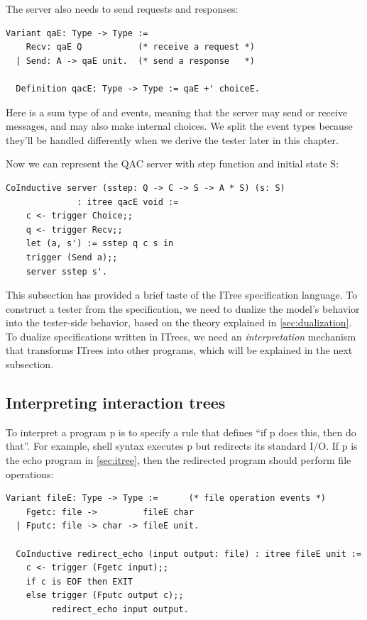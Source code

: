 The server also needs to send requests and responses:
\begin{lstlisting}[style=customcoq]
  Variant qaE: Type -> Type :=
    Recv: qaE Q           (* receive a request *)
  | Send: A -> qaE unit.  (* send a response   *)

  Definition qacE: Type -> Type := qaE +' choiceE.
\end{lstlisting}

Here  is a sum type of  and  events, meaning
that the server may send or receive messages, and may also make internal
choices.  We split the event types because they'll be handled differently when
we derive the tester later in this chapter.

Now we can represent the QAC server with step function  and initial
state \ilc S:
\begin{lstlisting}[style=customcoq]
  CoInductive server (sstep: Q -> C -> S -> A * S) (s: S)
              : itree qacE void :=
    c <- trigger Choice;;
    q <- trigger Recv;;
    let (a, s') := sstep q c s in
    trigger (Send a);;
    server sstep s'.
\end{lstlisting}

This subsection has provided a brief taste of the ITree specification language.
To construct a tester from the specification, we need to dualize the model's
behavior into the tester-side behavior, based on the theory explained in
\autoref{sec:dualization}.  To dualize specifications written in ITrees, we need
an {\em interpretation} mechanism that transforms ITrees into other programs,
which will be explained in the next subsection.

\subsection{Interpreting interaction trees}
To interpret a program \ilc p is to specify a rule that defines ``if \ilc p does
this, then do that''.  For example, shell syntax 
executes \inlinec p but redirects its standard I/O.  If \inlinec p is the echo
program in \autoref{sec:itree}, then the redirected program should perform file
operations:
\begin{lstlisting}[style=customcoq]
  Variant fileE: Type -> Type :=      (* file operation events *)
    Fgetc: file ->         fileE char
  | Fputc: file -> char -> fileE unit.

  CoInductive redirect_echo (input output: file) : itree fileE unit :=
    c <- trigger (Fgetc input);;
    if c is EOF then EXIT
    else trigger (Fputc output c);;
         redirect_echo input output.
\end{lstlisting}

